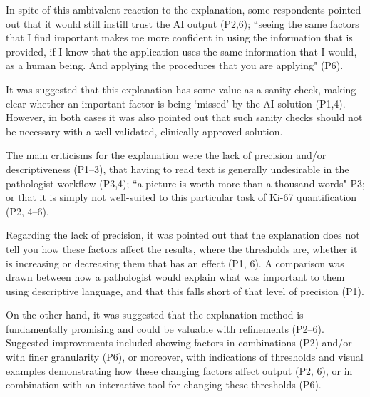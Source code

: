 In spite of this ambivalent reaction to the explanation, some respondents pointed out that it would still instill trust the AI output (P2,6); ``seeing the same factors that I find important makes me more confident in using the information that is provided, if I know that the application uses the same information that I would, as a human being. And applying the procedures that you are applying" (P6).


It was suggested that this explanation has some value as a sanity check, making clear whether an important factor is being `missed' by the AI solution (P1,4). However, in both cases it was also pointed out that such sanity checks should not be necessary with a well-validated, clinically approved solution.

The main criticisms for the explanation were the lack of precision and/or descriptiveness (P1--3), that having to read text is generally undesirable in the pathologist workflow (P3,4); ``a picture is worth more than a thousand words" P3; or that it is simply not well-suited to this particular task of Ki-67 quantification (P2, 4--6). 

Regarding the lack of precision, it was pointed out that the explanation does not tell you how these factors affect the results, where the thresholds are, whether it is increasing or decreasing them that has an effect (P1, 6). A comparison was drawn between how a pathologist would explain what was important to them using descriptive language, and that this falls short of that level of precision (P1).

On the other hand, it was suggested that the explanation method is fundamentally promising and could be valuable with refinements (P2--6). Suggested improvements included showing factors in combinations (P2) and/or with finer granularity (P6), or moreover, with indications of thresholds and visual examples demonstrating how these changing factors affect output (P2, 6), or in combination with an interactive tool for changing these thresholds (P6). %

